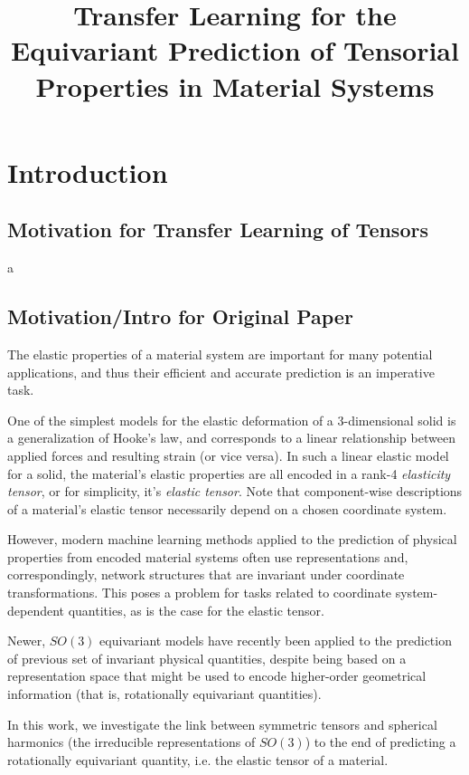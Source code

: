 \documentclass[10pt,a4paper]{article}
\title{Transfer Learning for the Equivariant Prediction of Tensorial Properties in Material Systems}
\author{}
\begin{document}
\maketitle

\section{Introduction}




\subsection{Motivation for Transfer Learning of Tensors}

a

\subsection{Motivation/Intro for Original Paper}
The elastic properties of a material system are important for many potential applications, and thus their efficient and accurate prediction is an imperative task. 

One of the simplest models for the elastic deformation of a 3-dimensional solid is a generalization of Hooke's law, and corresponds to a linear relationship between applied forces and resulting strain (or vice versa). In such a linear   elastic model for a solid, the material's elastic properties are all encoded in a rank-4 \textit{elasticity tensor}, or for simplicity, it's \textit{elastic tensor}. Note that component-wise descriptions of a material's elastic tensor necessarily depend on a chosen coordinate system.

However, modern machine learning methods applied to the prediction of physical properties from encoded material systems often use representations and, correspondingly, network structures that are invariant under coordinate transformations. This poses a problem for tasks related to coordinate system-dependent quantities, as is the case for the elastic tensor.

Newer, $SO(3)$ equivariant models have recently been applied to the prediction of previous set of invariant physical quantities, despite being based on a representation space that might be used to encode higher-order geometrical information (that is, rotationally equivariant quantities).
 
In this work, we investigate the link between symmetric tensors and spherical harmonics (the irreducible representations of $SO(3)$) to the end of predicting a rotationally equivariant quantity, i.e. the elastic tensor of a material.
\end{document}
